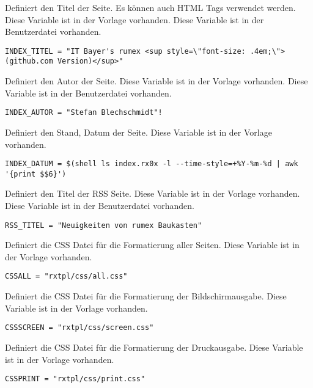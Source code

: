 {Definiert den Titel der Seite.
Es können auch HTML Tags verwendet werden.}
{Diese Variable ist in der Vorlage vorhanden.}
{Diese Variable ist in der Benutzerdatei vorhanden.}
{\scriptsize
\begin{Verbatim}
INDEX_TITEL = "IT Bayer's rumex <sup style=\"font-size: .4em;\"> (github.com Version)</sup>"
\end{Verbatim}
}


{Definiert den Autor der Seite.}
{Diese Variable ist in der Vorlage vorhanden.}
{Diese Variable ist in der Benutzerdatei vorhanden.}
{\scriptsize
\begin{Verbatim}
INDEX_AUTOR = "Stefan Blechschmidt"!
\end{Verbatim}
}


{Definiert den Stand, Datum der Seite.}
{Diese Variable ist in der Vorlage vorhanden.}
{}
{\scriptsize
\begin{Verbatim}
INDEX_DATUM = $(shell ls index.rx0x -l --time-style=+%Y-%m-%d | awk '{print $$6}')
\end{Verbatim}
}



{Definiert den Titel der RSS Seite.}
{Diese Variable ist in der Vorlage vorhanden.}
{Diese Variable ist in der Benutzerdatei vorhanden.}
{\scriptsize
\begin{Verbatim}
RSS_TITEL = "Neuigkeiten von rumex Baukasten"
\end{Verbatim}
}



{Definiert die CSS Datei für die Formatierung aller Seiten.}
{Diese Variable ist in der Vorlage vorhanden.}
{}
{\scriptsize
\begin{Verbatim}
CSSALL = "rxtpl/css/all.css"
\end{Verbatim}
}



{Definiert die CSS Datei für die Formatierung der Bildschirmausgabe.}
{Diese Variable ist in der Vorlage vorhanden.}
{}
{\scriptsize
\begin{Verbatim}
CSSSCREEN = "rxtpl/css/screen.css"
\end{Verbatim}
}



{Definiert die CSS Datei für die Formatierung der Druckausgabe.}
{Diese Variable ist in der Vorlage vorhanden.}
{}
{\scriptsize
\begin{Verbatim}
CSSPRINT = "rxtpl/css/print.css"
\end{Verbatim}
}



